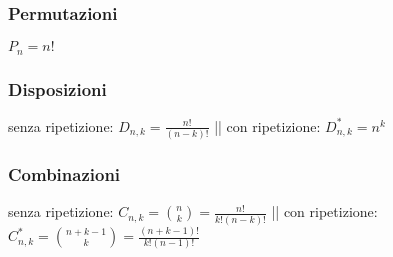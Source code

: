 \documentclass[10pt, oneside]{book}
\theoremstyle{plain}
\begin{document}
\subsubsection{Permutazioni} $\displaystyle P_n = n!$
\subsubsection{Disposizioni} senza ripetizione: $\displaystyle D_{n, k} = \frac{n!}{(n-k)!}$ || con ripetizione: $\displaystyle D_{n, k}^* = n^k$
\subsubsection{Combinazioni} senza ripetizione: $\displaystyle C_{n, k} = \binom{n}{k} = \frac{n!}{k! (n-k)!}$ || con ripetizione: $\displaystyle C_{n, k}^* = \binom{n + k - 1}{k} = \frac{(n+k-1)!}{k! (n-1)!}$
\end{document}
